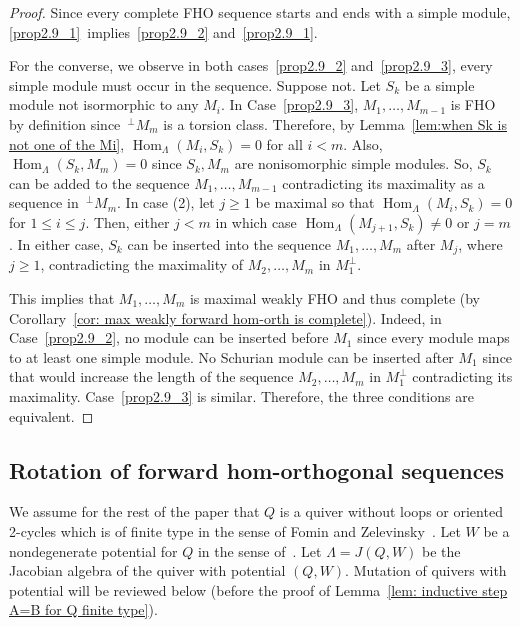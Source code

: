 \documentclass[10pt]{amsart}
\theoremstyle{definition}
\DeclareMathOperator{\Hom}{Hom}%
\begin{document}
\begin{proof} Since every complete FHO sequence starts and ends with a simple module, \ref{prop2.9_1}~implies~\ref{prop2.9_2} and~\ref{prop2.9_1}.

For the converse, we observe in both cases~\ref{prop2.9_2} and~\ref{prop2.9_3}, every simple module must occur in the sequence. Suppose not. Let $S_k$ be a simple module not isormorphic to any $M_i$. In Case~\ref{prop2.9_3}, $M_1,\ldots,M_{m-1}$ is FHO by definition since $\,^\perp M_m$ is a torsion class. Therefore, by Lemma~\ref{lem:when Sk is not one of the Mi}, $\Hom_\Lambda(M_i,S_k)=0$ for all $i<m$. Also, $\Hom_\Lambda(S_k,M_m)=0$ since $S_k,M_m$ are nonisomorphic simple modules. So, $S_k$ can be added to the sequence $M_1,\ldots,M_{m-1}$ contradicting its maximality as a sequence in $\,^\perp M_m$. In case (2), let $j\ge1$ be maximal so that $\Hom_\Lambda(M_i,S_k)=0$ for $1\le i\le j$. Then, either $j<m$ in which case $\Hom_\Lambda(M_{j+1},S_k)\neq0$ or $j=m$. In either case, $S_k$ can be inserted into the sequence $M_1,\ldots,M_m$ after $M_j$, where $j\ge1$, contradicting the maximality of $M_2,\ldots,M_m$ in $M_1^\perp$. 

This implies that $M_1,\ldots,M_m$ is maximal weakly FHO and thus complete (by Corollary~\ref{cor: max weakly forward hom-orth is complete}). Indeed, in Case~\ref{prop2.9_2}, no module can be inserted before $M_1$ since every module maps to at least one simple module. No Schurian module can be inserted after $M_1$ since that would increase the length of the sequence $M_2,\ldots,M_m$ in $M_1^\perp$ contradicting its maximality. Case~\ref{prop2.9_3} is similar. Therefore, the three conditions are equivalent.
\end{proof}


\subsection{Rotation of forward hom-orthogonal sequences} 


We assume for the rest of the paper that $Q$ is a quiver without loops or oriented 2-cycles which is of finite type in the sense of Fomin and Zelevinsky~\cite{FZ4}. Let $W$ be a nondegenerate potential for $Q$ in the sense of~\cite{DWZ1}. Let $\Lambda=J(Q,W)$ be the Jacobian algebra of the quiver with potential $(Q,W)$. Mutation of quivers with potential will be reviewed below (before the proof of Lemma~\ref{lem: inductive step A=B for Q finite type}).
\end{document}
